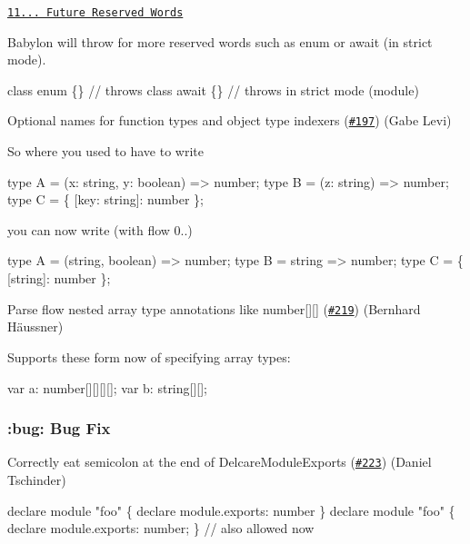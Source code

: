 \href{http://www.ecma-international.org/ecma-262/6.0/#sec-future-reserved-words}{\tt 11... Future Reserved Words}

Babylon will throw for more reserved words such as {\ttfamily enum} or {\ttfamily await} (in strict mode).


\begin{DoxyCode}
class enum \{\} // throws
class await \{\} // throws in strict mode (module)
\end{DoxyCode}


Optional names for function types and object type indexers (\href{https://github.com/babel/babylon/pull/197}{\tt \#197}) (Gabe Levi)

So where you used to have to write


\begin{DoxyCode}
type A = (x: string, y: boolean) => number;
type B = (z: string) => number;
type C = \{ [key: string]: number \};
\end{DoxyCode}


you can now write (with flow 0..)


\begin{DoxyCode}
type A = (string, boolean) => number;
type B = string => number;
type C = \{ [string]: number \};
\end{DoxyCode}


Parse flow nested array type annotations like {\ttfamily number\mbox{[}\mbox{]}\mbox{[}\mbox{]}} (\href{https://github.com/babel/babylon/pull/219}{\tt \#219}) (Bernhard Häussner)

Supports these form now of specifying array types\+:


\begin{DoxyCode}
var a: number[][][][];
var b: string[][];
\end{DoxyCode}


\subsubsection*{\+:bug\+: Bug Fix}

Correctly eat semicolon at the end of {\ttfamily Delcare\+Module\+Exports} (\href{https://github.com/babel/babylon/pull/223}{\tt \#223}) (Daniel Tschinder)


\begin{DoxyCode}
declare module "foo" \{ declare module.exports: number \}
declare module "foo" \{ declare module.exports: number; \}  // also allowed now
\end{DoxyCode}


